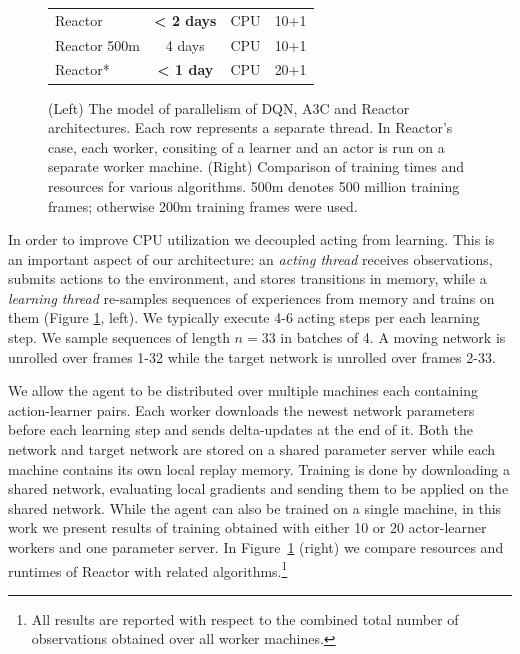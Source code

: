 \documentclass{article}
\begin{document}
\begin{figure}[t]
\begin{minipage}{.55\textwidth}
\begin{tabular}{| l | c | c | l |}
\cellcolor{reactor_color} Reactor & {\bf < 2 days} & CPU & 10+1 \\
\cellcolor{reactor_color} Reactor 500m & 4 days & CPU & 10+1 \\
\cellcolor{reactor_color} Reactor* & {\bf < 1 day} & CPU & 20+1 \\
\hline
\end{tabular}
\end{minipage}%
  \caption{\small (Left) The model of parallelism of DQN, A3C and Reactor 
    architectures. Each row represents a separate thread. In Reactor's case,
    each worker, consiting of a learner and an actor is run on a separate 
    worker machine. (Right) Comparison of training times and resources for 
    various algorithms. 500m denotes 500 million training frames; otherwise 
    200m training frames were used.}
  \label{parallelism}
\end{figure}

In order to improve CPU utilization we decoupled acting from learning. 
This is an important aspect of our architecture: an {\em acting thread} 
receives observations, submits actions to the environment, and stores 
transitions in memory, while a {\em learning thread} re-samples 
sequences of experiences from memory and trains on them (Figure 
\ref{parallelism}, left). We typically execute 4-6 acting steps per each 
learning step. We sample sequences of length $n=33$ in batches of 4. A moving 
network is unrolled over frames 1-32 while the target network is unrolled over 
frames 2-33.

We allow the agent to be distributed over 
multiple machines each containing action-learner pairs. Each worker downloads the 
newest network parameters before each learning step and sends delta-updates at 
the end of it. Both the network and target 
network are stored on a 
shared parameter server while each machine contains its own local replay 
memory. 
Training is done by downloading a shared network, evaluating local gradients 
and 
sending them to be applied on the shared network. While the agent can also be 
trained on a single machine, in this work we present results of 
training obtained with either 10 or 20 actor-learner workers and one parameter server.
In Figure~\ref{parallelism} (right) we compare resources and runtimes of 
Reactor with related algorithms.\footnote{All results are reported with respect 
to the combined total number of observations obtained over all worker machines.}
\end{document}
